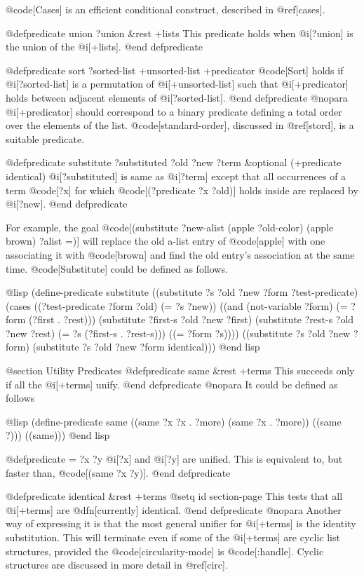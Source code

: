 {@code[Cases] is an efficient conditional construct, described in @ref[cases].

@defpredicate union ?union &rest +lists
This predicate holds when @i[?union] is the union of
the @i[+lists].
@end defpredicate

@defpredicate sort ?sorted-list +unsorted-list +predicator
@code[Sort] holds if @i[?sorted-list] is a permutation of 
@i[+unsorted-list] such that @i[+predicator] holds between adjacent
elements of @i[?sorted-list].
@end defpredicate
@nopara
@i[+predicator] should correspond to a binary predicate defining a
total order over the elements of the list. @code[standard-order],
discussed in @ref[stord], is a suitable predicate.

@defpredicate substitute ?substituted ?old ?new ?term &optional (+predicate identical)
@i[?substituted] is same as @i[?term] except that all occurrences of
a term @code[?x] for which @code[(?predicate ?x ?old)] holds inside 
are replaced by @i[?new].
@end defpredicate

For example, the goal @code[(substitute ?new-alist (apple ?old-color)
(apple brown) ?alist =)] will replace the old a-list entry of @code[apple] with
one associating it with @code[brown] and find the old entry's association at
the same time.
@code[Substitute] could be defined as follows.

@lisp
(define-predicate substitute
  ((substitute ?s ?old ?new ?form ?test-predicate)
   (cases ((?test-predicate ?form ?old) (= ?s ?new))
          ((and (not-variable ?form) (= ?form (?first . ?rest)))
           (substitute ?first-s ?old ?new ?first)
           (substitute ?rest-s ?old ?new ?rest)
           (= ?s (?first-s . ?rest-s)))
          ((= ?form ?s))))
  ((substitute ?s ?old ?new ?form)
   (substitute ?s ?old ?new ?form identical)))
@end lisp

@section Utility Predicates
@defpredicate same &rest +terms
This succeeds only if all the @i[+terms] unify.
@end defpredicate
@nopara
It could be defined as follows

@lisp
(define-predicate same
  ((same ?x ?x . ?more)
   (same ?x . ?more))
  ((same ?)))
  ((same)))
@end lisp

@defpredicate = ?x ?y
@i[?x] and @i[?y] are unified.
This is equivalent to, but faster than, @code[(same ?x ?y)].
@end defpredicate

@defpredicate identical &rest +terms
@setq id section-page
This tests that all @i[+terms] are @dfn[currently] identical.
@end defpredicate
@nopara
Another way of expressing it is that the most general unifier for
@i[+terms] is the identity substitution.  This will terminate even if
some of the @i[+terms] are cyclic list structures, provided the
@code[circularity-mode] is @code[:handle].  Cyclic structures are discussed
in more detail in @ref[circ].

}
